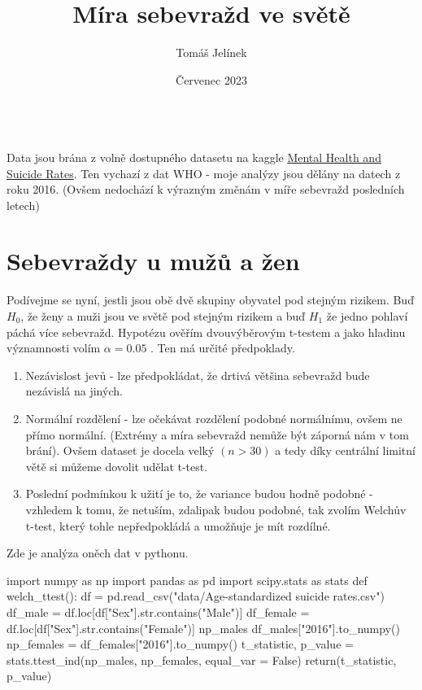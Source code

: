 \documentclass[12pt]{article}
\title{Míra sebevražd ve světě}
\author{Tomáš Jelínek}
\date{Červenec 2023}
\begin{document}
\maketitle
{}\\

Data jsou brána z volně dostupného datasetu na kaggle \href{https://www.kaggle.com/datasets/twinkle0705/mental-health-and-suicide-rates?select=Facilities.csv}{Mental Health and Suicide Rates}. Ten vychazí z dat WHO - moje analýzy jsou dělány na datech z roku 2016. (Ovšem nedochází k výrazným změnám v míře sebevražd posledních letech) 

\section{Sebevraždy u mužů a žen}
Podívejme se nyní, jestli jsou obě dvě skupiny obyvatel pod stejným rizikem. Buď $H_0$, že ženy a muži jsou ve světě pod stejným rizikem a buď $H_1$ že jedno pohlaví páchá více sebevražd. Hypotézu ověřím dvouvýběrovým t-testem a jako hladinu významnosti volím $\alpha = 0.05$ . Ten má určité předpoklady.
\begin{enumerate}
\item Nezávislost jevů - lze předpokládat, že drtivá většina sebevražd bude nezávislá na jiných.
\item Normální rozdělení - lze očekávat rozdělení podobné normálnímu, ovšem ne přímo normální. (Extrémy a míra sebevražd nemůže být záporná nám v tom brání). Ovšem dataset je docela velký $(n > 30)$ a tedy díky centrální limitní větě si můžeme dovolit udělat t-test.
\item Poslední podmínkou k užití je to, že variance budou hodně podobné - vzhledem k tomu, že netuším, zdalipak budou podobné, tak zvolím Welchův t-test, který tohle nepředpokládá a umožňuje je mít rozdílné.
\end{enumerate}

\newpage
Zde je analýza oněch dat v pythonu.
\begin{python}
import numpy as np
import pandas as pd
import scipy.stats as stats
def welch_ttest():
		df = pd.read_csv("data/Age-standardized suicide rates.csv")
    df_male = df.loc[df["Sex"].str.contains("Male")]
    df_female = df.loc[df["Sex"].str.contains("Female")]
    np_males df_males["2016"].to_numpy()
    np_females = df_females["2016"].to_numpy()
    t_statistic, p_value = stats.ttest_ind(np_males, np_females, equal_var = False)
    return(t_statistic, p_value)
\end{python}
\end{document}
